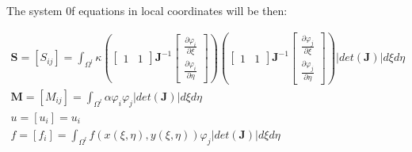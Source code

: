 \documentclass{article}
\begin{document}
The system 0f equations in local coordinates will be then:

\begin{equation}\label{eq:2D_Poisson_Sys}
    \begin{gathered}
        \textbf{S}=[S_{ij}]=\int_{\Omega^{l}}{\kappa \left(\begin{bmatrix}
            1&1
        \end{bmatrix}\textbf{J}^{-1}\begin{bmatrix}
            \frac{\partial \varphi_i}{\partial \xi}\\
            \frac{\partial \varphi_i}{\partial \eta}
        \end{bmatrix}   \right)\left(\begin{bmatrix}
            1&1
        \end{bmatrix}\textbf{J}^{-1}\begin{bmatrix}
            \frac{\partial \varphi_j}{\partial \xi}\\
            \frac{\partial \varphi_j}{\partial \eta}
        \end{bmatrix}   \right) |det(\textbf{J})|d\xi d\eta}\\
        \textbf{M}=[M_{ij}]=\int_{\Omega^l}{\alpha \varphi_i \varphi_j |det(\textbf{J})|d\xi d\eta}\\
        u=[u_i]=u_i\\
        f=[f_i]=\int_{\Omega^l}{f(x(\xi,\eta),y(\xi,\eta)) \varphi_j |det(\textbf{J})|d\xi d\eta}
    \end{gathered}
\end{equation}
\end{document}
